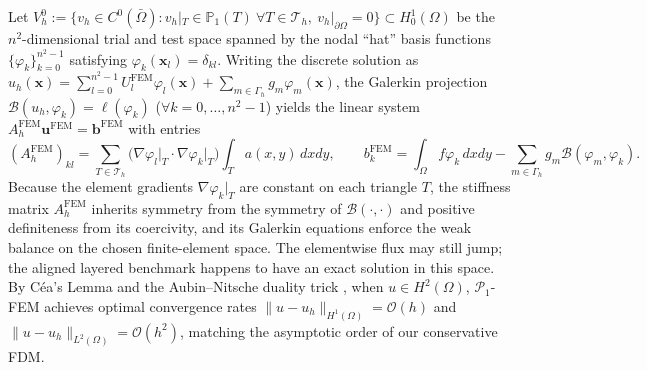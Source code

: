 \documentclass[11pt,a4paper]{article}
\theoremstyle{definition}
\theoremstyle{remark}
\begin{document}
Let $V_h^0 := \{ v_h \in C^0(\bar{\Omega}) : v_h|_T \in \mathbb{P}_1(T)\ \forall T \in \mathcal{T}_h,\ v_h|_{\partial\Omega} = 0 \} \subset H_0^1(\Omega)$ be the $n^2$-dimensional trial and test space spanned by the nodal ``hat'' basis functions $\{\varphi_k\}_{k=0}^{n^2-1}$ satisfying $\varphi_k(\bm{x}_l) = \delta_{kl}$. Writing the discrete solution as $u_h(\bm{x}) = \sum_{l=0}^{n^2-1} U_l^{\text{FEM}} \varphi_l(\bm{x}) + \sum_{m \in \Gamma_h} g_m \varphi_m(\bm{x})$, the Galerkin projection $\mathcal{B}(u_h, \varphi_k) = \ell(\varphi_k)$ ($\forall k = 0,\dots,n^2-1$) yields the linear system $A_h^{\text{FEM}} \bm{u}^{\text{FEM}} = \bm{b}^{\text{FEM}}$ with entries
\begin{equation}
    (A_h^{\text{FEM}})_{kl} = \sum_{T \in \mathcal{T}_h} \bigl(\nabla\varphi_l\big|_T \cdot \nabla\varphi_k\big|_T\bigr) \int_T a(x,y)\,dxdy, \qquad
    b_k^{\text{FEM}} = \int_\Omega f \varphi_k\,dxdy - \sum_{m \in \Gamma_h} g_m \mathcal{B}(\varphi_m, \varphi_k).
    \label{eq:fem_system}
\end{equation}
Because the element gradients $\nabla\varphi_k|_T$ are constant on each triangle $T$, the stiffness matrix $A_h^{\text{FEM}}$ inherits symmetry from the symmetry of $\mathcal{B}(\cdot,\cdot)$ and positive definiteness from its coercivity, and its Galerkin equations enforce the weak balance on the chosen finite-element space. The elementwise flux may still jump; the aligned layered benchmark happens to have an exact solution in this space. By Céa's Lemma and the Aubin--Nitsche duality trick \cite{hiptmair2025}, when $u \in H^2(\Omega)$, $\mathcal{P}_1$-FEM achieves optimal convergence rates $\|u - u_h\|_{H^1(\Omega)} = \mathcal{O}(h)$ and $\|u - u_h\|_{L^2(\Omega)} = \mathcal{O}(h^2)$, matching the asymptotic order of our conservative FDM.
\end{document}
